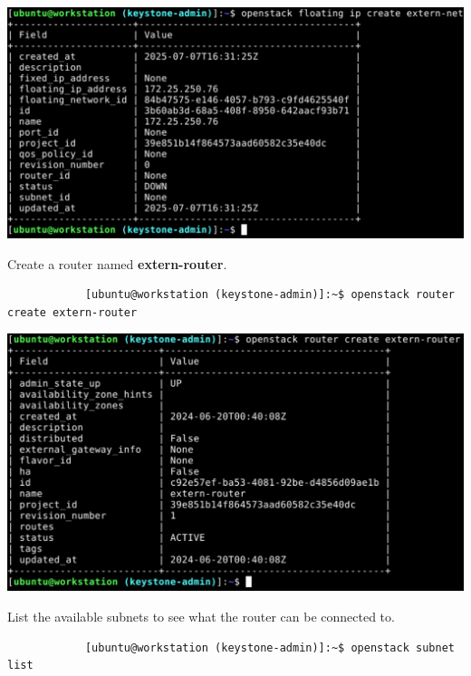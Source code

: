 \documentclass[letterpaper, 12pt]{article}
\begin{document}
\begin{enumerate}
\begin{labstep}
        \begin{center}
            \includegraphics[width=\linewidth]{images/part1/step16.png}
        \end{center}
    \end{labstep}

    \begin{labstep}
        Create a router named \textbf{extern-router}.
        \begin{lstlisting}
            [ubuntu@workstation (keystone-admin)]:~$ openstack router create extern-router
        \end{lstlisting}

        \begin{center}
            \includegraphics[width=\linewidth]{images/part1/step17.png}
        \end{center}
    \end{labstep}

    \begin{labstep}
        List the available subnets to see what the router can be connected to.
        \begin{lstlisting}
            [ubuntu@workstation (keystone-admin)]:~$ openstack subnet list
        \end{lstlisting}


\end{labstep}
\end{enumerate}
\end{document}
